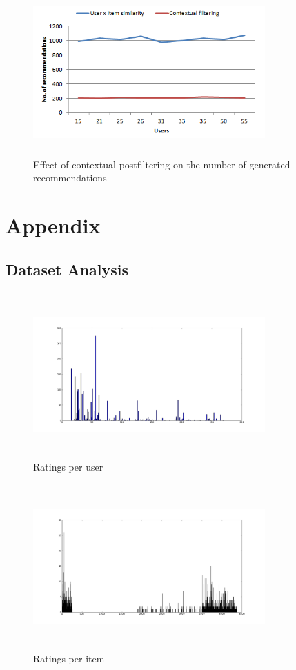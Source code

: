 \documentclass{article}
\begin{document}
\begin{figure}[H]
\includegraphics[height=2.5in, width=3.5in]{numberrecos.png}
\caption{Effect of contextual postfiltering on the number of generated recommendations}
\label{numberrecos}
\end{figure}

\newpage
\section{Appendix}
\subsection{Dataset Analysis}

\begin{figure}[H]
\centering
\includegraphics[height=2.5in, width=3.5in]{ratingsperuser.png}
\caption{Ratings per user}
\label{ruser}
\end{figure}

\begin{figure}[H]
\centering
\includegraphics[height=2.5in, width=3.5in]{ratungspermovie.png}
\caption{Ratings per item}
\label{ritem}
\end{figure}



\end{document}
